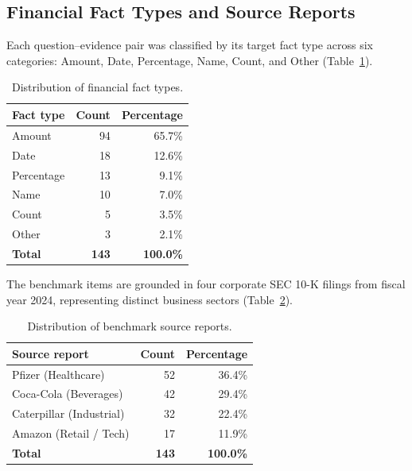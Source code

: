 \documentclass[11pt,letterpaper]{article}
\begin{document}
\subsection{Financial Fact Types and Source Reports}
\label{app:fact_types}

Each question--evidence pair was classified by its target fact type across six categories: Amount, Date, Percentage, Name, Count, and Other (Table~\ref{tab:fact_types}).

\begin{table}[h]
\centering
\small
\caption{Distribution of financial fact types.}
\label{tab:fact_types}
\begin{tabular}{lrr}
\toprule
\textbf{Fact type} & \textbf{Count} & \textbf{Percentage} \\
\midrule
Amount     & 94  & 65.7\% \\
Date       & 18  & 12.6\% \\
Percentage & 13  & 9.1\%  \\
Name       & 10  & 7.0\%  \\
Count      & 5   & 3.5\%  \\
Other      & 3   & 2.1\%  \\
\midrule
\textbf{Total} & \textbf{143} & \textbf{100.0\%} \\
\bottomrule
\end{tabular}
\end{table}

The benchmark items are grounded in four corporate SEC 10-K filings from fiscal year 2024, representing distinct business sectors (Table~\ref{tab:source_reports}).

\begin{table}[h]
\centering
\small
\caption{Distribution of benchmark source reports.}
\label{tab:source_reports}
\begin{tabular}{lrr}
\toprule
\textbf{Source report} & \textbf{Count} & \textbf{Percentage} \\
\midrule
Pfizer (Healthcare)        & 52 & 36.4\% \\
Coca-Cola (Beverages)      & 42 & 29.4\% \\
Caterpillar (Industrial)   & 32 & 22.4\% \\
Amazon (Retail / Tech)     & 17 & 11.9\% \\
\midrule
\textbf{Total} & \textbf{143} & \textbf{100.0\%} \\
\bottomrule
\end{tabular}
\end{table}
\end{document}
